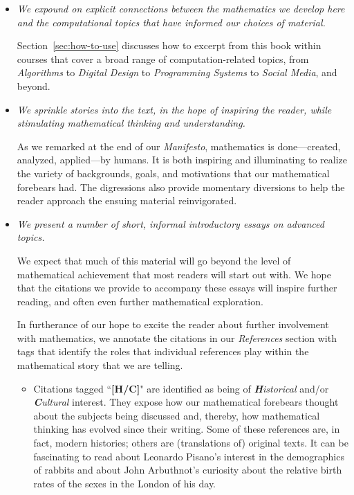 \begin{itemize}
\item
{\em We expound on explicit connections between the mathematics we develop here and the computational topics that have informed our choices of material.}

\smallskip

Section~\ref{sec:how-to-use} discusses how to excerpt from this book within courses that cover a broad range of computation-related topics, from {\em Algorithms} to {\em Digital Design} to {\em Programming Systems} to {\em Social Media}, and beyond.

\item
{\em We sprinkle stories into the text, in the hope of inspiring the reader, while stimulating mathematical thinking and understanding.}

\smallskip

As we remarked at the end of our {\it Manifesto}, mathematics is done---created, analyzed, applied---by humans.  It is both inspiring and illuminating to realize the variety of backgrounds, goals, and motivations that our mathematical forebears had.  The digressions also provide momentary diversions to help the reader approach the ensuing material reinvigorated.

\item
{\em We present a number of short, informal introductory essays on advanced topics.}

\smallskip

We expect that much of this material will go beyond the level of mathematical achievement that most readers will start out with.  We hope that the citations we provide to accompany these essays will inspire further reading, and often even further mathematical exploration.

\smallskip

In furtherance of our hope to excite the reader about further involvement with mathematics, we annotate the citations in our {\it References} section with tags that identify the roles that individual references play within the mathematical story that we are telling.
  \begin{itemize}
  \item
Citations tagged ``{\bf [H/C]}" are identified as being of {\em {\bf H}istorical} and/or {\em {\bf C}ultural} interest.  They expose how our mathematical forebears thought about the subjects being discussed and, thereby, how mathematical thinking has evolved since their writing.  Some of these references are, in fact, modern histories; others are (translations of) original texts.  It can be fascinating to read about Leonardo Pisano's interest in the demographics of rabbits and about John Arbuthnot's curiosity about the relative birth rates of the sexes in the London of his day.


\end{itemize}
\end{itemize}
